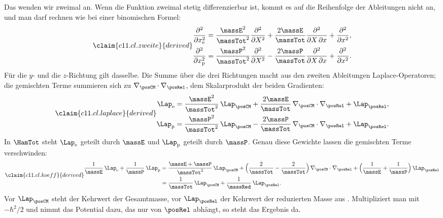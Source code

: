 Das wenden wir zweimal an. Wenn die Funktion zweimal stetig differenzierbar ist, kommt
es auf die Reihenfolge der Ableitungen nicht an, und man darf rechnen wie bei einer
binomischen Formel:
\begin{equation}\label{c11.eq.zweite}\claim{c11.cl.zweite}{derived}
  \begin{aligned}
    \frac{\partial^2}{\partial x_{\mathrm{e}}^2}
    &= \frac{\massE^2}{\massTot^2}\frac{\partial^2}{\partial X^2}
     + \frac{2\massE}{\massTot}\frac{\partial^2}{\partial X\,\partial x}
     + \frac{\partial^2}{\partial x^2}, \\
    \frac{\partial^2}{\partial x_{\mathrm{p}}^2}
    &= \frac{\massP^2}{\massTot^2}\frac{\partial^2}{\partial X^2}
     - \frac{2\massP}{\massTot}\frac{\partial^2}{\partial X\,\partial x}
     + \frac{\partial^2}{\partial x^2}.
  \end{aligned}
\end{equation}
Für die $y$- und die $z$-Richtung gilt dasselbe. Die Summe über die drei Richtungen
macht aus den zweiten Ableitungen Laplace-Operatoren; die gemischten Terme summieren
sich zu $\nabla_{\posCM} \cdot \nabla_{\posRel}$, dem Skalarprodukt der beiden
Gradienten:
\begin{equation}\label{c11.eq.laplace}\claim{c11.cl.laplace}{derived}
  \begin{aligned}
    \Lap_{\mathrm{e}}
    &= \frac{\massE^2}{\massTot^2}\,\Lap_{\posCM}
     + \frac{2\massE}{\massTot}\,\nabla_{\posCM} \cdot \nabla_{\posRel}
     + \Lap_{\posRel}, \\
    \Lap_{\mathrm{p}}
    &= \frac{\massP^2}{\massTot^2}\,\Lap_{\posCM}
     - \frac{2\massP}{\massTot}\,\nabla_{\posCM} \cdot \nabla_{\posRel}
     + \Lap_{\posRel}.
  \end{aligned}
\end{equation}
In $\HamTot$ steht $\Lap_{\mathrm{e}}$ geteilt durch $\massE$ und $\Lap_{\mathrm{p}}$
geteilt durch $\massP$. Genau diese Gewichte lassen die gemischten Terme verschwinden:
\begin{equation}\label{c11.eq.koeff}\claim{c11.cl.koeff}{derived}
  \begin{aligned}
    \frac{1}{\massE}\,\Lap_{\mathrm{e}} + \frac{1}{\massP}\,\Lap_{\mathrm{p}}
    &= \frac{\massE + \massP}{\massTot^2}\,\Lap_{\posCM}
     + \Bigl(\frac{2}{\massTot} - \frac{2}{\massTot}\Bigr)\,
       \nabla_{\posCM} \cdot \nabla_{\posRel}
     + \Bigl(\frac{1}{\massE} + \frac{1}{\massP}\Bigr)\,\Lap_{\posRel} \\
    &= \frac{1}{\massTot}\,\Lap_{\posCM} + \frac{1}{\massRed}\,\Lap_{\posRel}.
  \end{aligned}
\end{equation}
Vor $\Lap_{\posCM}$ steht der Kehrwert der Gesamtmasse, vor $\Lap_{\posRel}$ der Kehrwert
der reduzierten Masse aus . Multipliziert man mit $-\hbar^2/2$ und nimmt das
Potential dazu, das nur von $\posRel$ abhängt, so steht das Ergebnis da.

